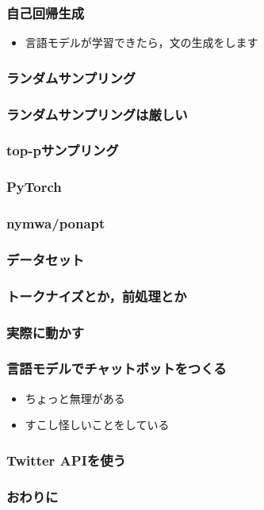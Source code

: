 \documentclass[14pt]{beamer}
\begin{document}
\begin{frame}
	\frametitle{自己回帰生成}

	\begin{itemize}
		\item 言語モデルが学習できたら，文の生成をします
	\end{itemize}
\end{frame}

\begin{frame}
	\frametitle{ランダムサンプリング}
\end{frame}

\begin{frame}
	\frametitle{ランダムサンプリングは厳しい}
\end{frame}

\begin{frame}
	\frametitle{top-pサンプリング}
\end{frame}

\begin{frame}
	\frametitle{PyTorch}
\end{frame}

\begin{frame}
	\frametitle{nymwa/ponapt}
\end{frame}

\begin{frame}
	\frametitle{データセット}

\end{frame}

\begin{frame}
	\frametitle{トークナイズとか，前処理とか}
\end{frame}

\begin{frame}
	\frametitle{実際に動かす}
\end{frame}

\begin{frame}
	\frametitle{言語モデルでチャットボットをつくる}

	\begin{itemize}
		\item ちょっと無理がある
		\item すこし怪しいことをしている
	\end{itemize}
\end{frame}

\begin{frame}
	\frametitle{Twitter APIを使う}
\end{frame}

\begin{frame}
	\frametitle{おわりに}
\end{frame}
\end{document}
